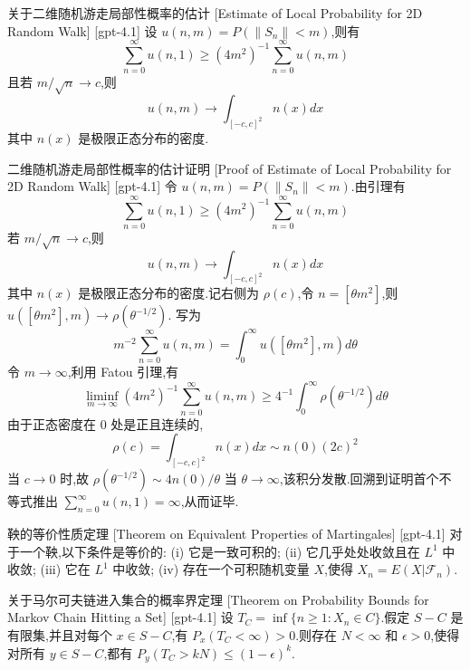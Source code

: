 \documentclass[UTF8]{ctexart}
\begin{document}
    
    
    \begin{lma}
        {关于二维随机游走局部性概率的估计}
        [Estimate of Local Probability for 2D Random Walk]
        [gpt-4.1]
        设 $u(n, m) = P(\|S_n\| < m)$,则有
\[
\sum_{n=0}^\infty u(n, 1) \geq (4m^2)^{-1} \sum_{n=0}^\infty u(n, m)
\]
且若 $m / \sqrt{n} \to c$,则
\[
u(n, m) \to \int_{[-c, c]^2} n(x) dx
\]
其中 $n(x)$ 是极限正态分布的密度.
    \end{lma}
    
    
    
    \begin{prf}
        {二维随机游走局部性概率的估计证明}
        [Proof of Estimate of Local Probability for 2D Random Walk]
        [gpt-4.1]
        令 $u(n, m) = P(\|S_n\| < m)$.由引理有
\[
\sum_{n=0}^\infty u(n, 1) \geq (4m^2)^{-1} \sum_{n=0}^\infty u(n, m)
\]
若 $m / \sqrt{n} \to c$,则
\[
u(n, m) \to \int_{[-c, c]^2} n(x) dx
\]
其中 $n(x)$ 是极限正态分布的密度.记右侧为 $\rho(c)$,令 $n = [\theta m^2]$,则 $u([\theta m^2], m) \to \rho(\theta^{-1/2})$.
写为
\[
m^{-2} \sum_{n=0}^\infty u(n, m) = \int_0^\infty u([\theta m^2], m) d\theta
\]
令 $m \to \infty$,利用 Fatou 引理,有
\[
\operatorname*{liminf}_{m \to \infty} (4m^2)^{-1} \sum_{n=0}^\infty u(n, m) \geq 4^{-1} \int_0^\infty \rho(\theta^{-1/2}) d\theta
\]
由于正态密度在 0 处是正且连续的,
\[
\rho(c) = \int_{[-c, c]^2} n(x) dx \sim n(0) (2c)^2
\]
当 $c \to 0$ 时,故 $\rho(\theta^{-1/2}) \sim 4 n(0)/\theta$ 当 $\theta \to \infty$,该积分发散.回溯到证明首个不等式推出 $\sum_{n=0}^\infty u(n, 1) = \infty$,从而证毕.
    \end{prf}
    
    
    
    \begin{thm}
        {鞅的等价性质定理}
        [Theorem on Equivalent Properties of Martingales]
        [gpt-4.1]
        对于一个鞅,以下条件是等价的:
(i) 它是一致可积的;
(ii) 它几乎处处收敛且在 $L^{1}$ 中收敛;
(iii) 它在 $L^{1}$ 中收敛;
(iv) 存在一个可积随机变量 $X$,使得 $X_{n} = E(X|\mathcal{F}_{n})$.
    \end{thm}
    
    
    
    \begin{thm}
        {关于马尔可夫链进入集合的概率界定理}
        [Theorem on Probability Bounds for Markov Chain Hitting a Set]
        [gpt-4.1]
        设 $T _ { C } = \operatorname*{inf} \{ n \geq 1 : X _ { n } \in C \}$.假定 $S - C$ 是有限集,并且对每个 $x \in S - C$,有 $P _ { x } ( T _ { C } < \infty ) > 0$.则存在 $N < \infty$ 和 $\epsilon > 0$,使得对所有 $y \in S - C$,都有 $P _ { y } ( T _ { C } > k N ) \leq ( 1 - \epsilon ) ^ { k }$.
    \end{thm}
    
\end{document}
